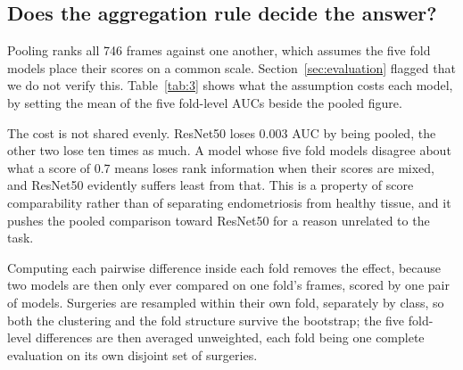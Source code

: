 \documentclass[preprint,12pt]{elsarticle}
\begin{document}
\subsection{Does the aggregation rule decide the answer?}
\label{sec:aggregation}

Pooling ranks all 746 frames against one another, which assumes the five fold models place their scores on a common scale. Section~\ref{sec:evaluation} flagged that we do not verify this. Table~\ref{tab:3} shows what the assumption costs each model, by setting the mean of the five fold-level AUCs beside the pooled figure.

\begin{table}[t]
\centering
\caption{AUC computed inside each fold, against the pooled figure. The last column is what pooling costs each model.}
\label{tab:3}
\small
\setlength{\tabcolsep}{4pt}
\end{table}

The cost is not shared evenly. ResNet50 loses 0.003 AUC by being pooled, the other two lose ten times as much. A model whose five fold models disagree about what a score of 0.7 means loses rank information when their scores are mixed, and ResNet50 evidently suffers least from that. This is a property of score comparability rather than of separating endometriosis from healthy tissue, and it pushes the pooled comparison toward ResNet50 for a reason unrelated to the task.

Computing each pairwise difference inside each fold removes the effect, because two models are then only ever compared on one fold's frames, scored by one pair of models. Surgeries are resampled within their own fold, separately by class, so both the clustering and the fold structure survive the bootstrap; the five fold-level differences are then averaged unweighted, each fold being one complete evaluation on its own disjoint set of surgeries.
\end{document}
